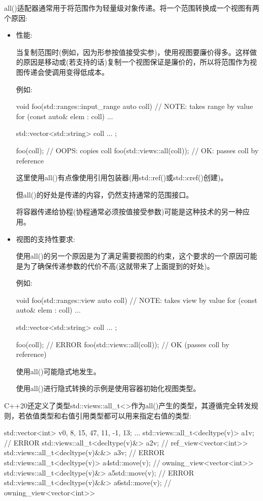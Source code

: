 all()适配器通常用于将范围作为轻量级对象传递。将一个范围转换成一个视图有两个原因:

\begin{itemize}
\item
性能:

当复制范围时(例如，因为形参按值接受实参)，使用视图要廉价得多。这样做的原因是移动或(若支持的话)复制一个视图保证是廉价的，所以将范围作为视图传递会使调用变得低成本。

例如:

\begin{cpp}
void foo(std::ranges::input_range auto coll) // NOTE: takes range by value
{
	for (const auto& elem : coll) {
		...
	}
}

std::vector<std::string> coll{ ... };

foo(coll); // OOPS: copies coll
foo(std::views::all(coll)); // OK: passes coll by reference
\end{cpp}

这里使用all()有点像使用引用包装器(用std::ref()或std::cref()创建)。

但all()的好处是传递的内容，仍然支持通常的范围接口。

将容器传递给协程(协程通常必须按值接受参数)可能是这种技术的另一种应用。

\item
视图的支持性要求:

使用all()的另一个原因是为了满足需要视图的约束，这个要求的一个原因可能是为了确保传递参数的代价不高(这就带来了上面提到的好处)。

例如:

\begin{cpp}
void foo(std::ranges::view auto coll) // NOTE: takes view by value
{
	for (const auto& elem : coll) {
		...
	}
}

std::vector<std::string> coll{ ... };

foo(coll); // ERROR
foo(std::views::all(coll)); // OK (passes coll by reference)
\end{cpp}

使用all()可能隐式地发生。

使用all()进行隐式转换的示例是使用容器初始化视图类型。
\end{itemize}


C++20还定义了类型std::views::all\_t<>作为all()产生的类型，其遵循完全转发规则，若依值类型和右值引用类型都可以用来指定右值的类型:

\begin{cpp}
std::vector<int> v{0, 8, 15, 47, 11, -1, 13};
...
std::views::all_t<decltype(v)> a1{v}; // ERROR
std::views::all_t<decltype(v)&> a2{v}; // ref_view<vector<int>>
std::views::all_t<decltype(v)&&> a3{v}; // ERROR
std::views::all_t<decltype(v)> a4{std::move(v)}; // owning_view<vector<int>>
std::views::all_t<decltype(v)&> a5{std::move(v)}; // ERROR
std::views::all_t<decltype(v)&&> a6{std::move(v)}; // owning_view<vector<int>>
\end{cpp}

